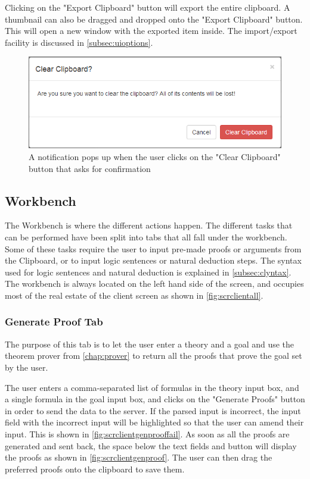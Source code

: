 \documentclass[11pt,twoside,a4paper]{report}
\begin{document}
Clicking on the "Export Clipboard" button will export the entire clipboard. A thumbnail can also be dragged and dropped onto the "Export Clipboard" button. This will open a new window with the exported item inside. The import/export facility is discussed in \autoref{subsec:uioptions}.

\begin{figure}[htp]
\centerline{\includegraphics[scale=0.6]{img/scr-client-clearclipboard.png}}
\caption{A notification pops up when the user clicks on the "Clear Clipboard" button that asks for confirmation\label{fig:scrclientcleaboard}}
\end{figure}

\subsection{Workbench}
The Workbench is where the different actions happen. The different tasks that can be performed have been split into tabs that all fall under the workbench. Some of these tasks require the user to input pre-made proofs or arguments from the Clipboard, or to input logic sentences or natural deduction steps. The syntax used for logic sentences and natural deduction is explained in \autoref{subsec:clyntax}. The workbench is always located on the left hand side of the screen, and occupies most of the real estate of the client screen as shown in \autoref{fig:scrclientall}.

\subsubsection{Generate Proof Tab}
The purpose of this tab is to let the user enter a theory and a goal and use the theorem prover from \autoref{chap:prover} to return all the proofs that prove the goal set by the user.

The user enters a comma-separated list of formulas in the theory input box, and a single formula in the goal input box, and clicks on the "Generate Proofs" button in order to send the data to the server. If the parsed input is incorrect, the input field with the incorrect input will be highlighted so that the user can amend their input. This is shown in \autoref{fig:scrclientgenprooffail}. As soon as all the proofs are generated and sent back, the space below the text fields and button will display the proofs as shown in \autoref{fig:scrclientgenproof}. The user can then drag the preferred proofs onto the clipboard to save them.
\end{document}
